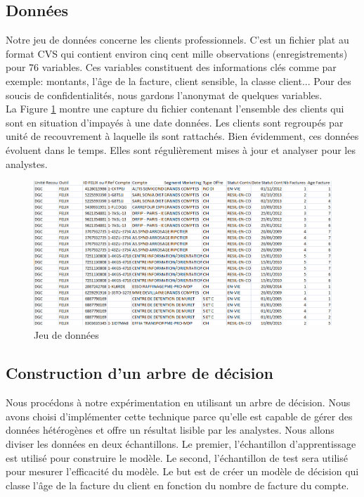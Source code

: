 \documentclass[11pt,a4paper]{report}
\begin{document}
\subsection{Données \label{jeux_données}}  
 Notre jeu  de données concerne les clients professionnels. C'est un fichier plat au format CVS qui contient environ cinq cent mille observations (enregistrements) pour 76 variables. Ces variables constituent des informations clés comme par exemple: montants, l’âge de la facture, client sensible, la classe client... Pour des soucis de confidentialités, nous gardons l'anonymat de quelques variables.  \\
 La Figure \ref{donnees} montre une capture du fichier contenant l'ensemble des clients qui sont en situation d'impayés à une date données. Les clients sont regroupés par unité de recouvrement à laquelle ils sont rattachés. Bien évidemment, ces données évoluent dans le temps. Elles sont régulièrement mises à jour et analyser pour les analystes.  

     \begin{figure}[h]
%
%
%
   \centering
   \includegraphics[scale=0.60]{jd1.PNG}
     \caption{Jeu de données}
     \label{donnees}
\end{figure}
\newpage


\subsection{Construction d'un arbre de décision}
Nous procédons à notre expérimentation en utilisant un arbre de décision. Nous avons choisi d'implémenter cette technique parce qu'elle est capable de gérer des données hétérogènes et offre un résultat lisible par les analystes. 
Nous allons diviser les données en deux échantillons. Le premier, l'échantillon d'apprentissage est utilisé pour construire le modèle. Le second, l'échantillon de test sera utilisé pour mesurer l'efficacité du modèle. Le but est de créer un modèle de décision qui classe l'âge de la facture du client en fonction du nombre de facture du compte. \\
\end{document}
